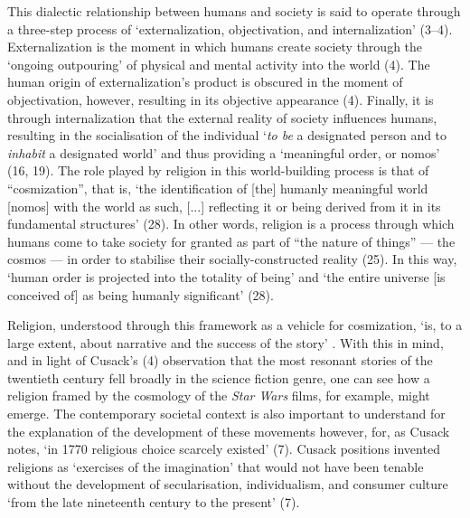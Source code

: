 \documentclass[Draft.tex]{subfiles}
\begin{document}
This dialectic relationship between humans and society is said to operate
through a three-step process of
`externalization, objectivation, and internalization' (3--4).
Externalization is the moment in which humans create society
through the `ongoing outpouring' of physical and mental activity
into the world (4).
The human origin of externalization's product is obscured
in the moment of objectivation, however,
resulting in its objective appearance (4).
Finally, it is through internalization that the external
reality of society influences humans, resulting in
the socialisation of the individual
`\textit{to be} a designated person
and to \textit{inhabit} a designated world'
and thus providing a `meaningful order, or nomos' (16, 19).
The role played by religion in this world-building process
is that of ``cosmization'', that is,
`the identification of [the] humanly meaningful world [nomos]
with the world as such, [...] reflecting it or being derived from it
in its fundamental structures' (28).
In other words, religion is a process through which humans
come to take society for granted as part of ``the nature of things''
--- the cosmos --- in order to stabilise their socially-constructed reality (25).
In this way, `human order is projected into the totality of being'
and `the entire universe [is conceived of] as being humanly significant' (28).

Religion, understood through this framework as a vehicle for cosmization,
`is, to a large extent, about narrative
and the success of the story' \parencite[4]{Cusack10}.
With this in mind, and in light of Cusack's (4) observation
that the most resonant stories of the twentieth century
fell broadly in the science fiction genre,
one can see how a religion framed by the cosmology of
the \textit{Star Wars} films, for example, might emerge.
The contemporary societal context is also important to understand
for the explanation of the development of these movements however,
for, as Cusack notes, `in 1770 religious choice scarcely existed' (7).
Cusack positions invented religions as `exercises of the imagination'
that would not have been tenable without the development of
secularisation, individualism, and consumer culture
`from the late nineteenth century to the present' (7).
\end{document}
